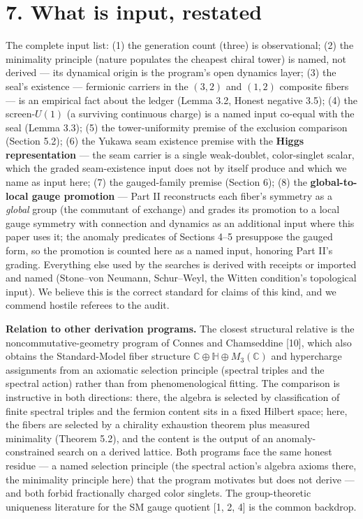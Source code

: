 \documentclass[11pt]{article}
\begin{document}
\section*{7. What is input, restated}
The complete input list: (1) the generation count (three) is observational; (2) the minimality principle (nature populates the cheapest chiral tower) is named, not derived — its dynamical origin is the program's open dynamics layer; (3) the seal's existence — fermionic carriers in the $(3,2)$ and $(1,2)$ composite fibers — is an empirical fact about the ledger (Lemma 3.2, Honest negative 3.5); (4) the screen-$U(1)$ (a surviving continuous charge) is a named input co-equal with the seal (Lemma 3.3); (5) the tower-uniformity premise of the exclusion comparison (Section 5.2); (6) the Yukawa seam existence premise with the \textbf{Higgs representation} — the seam carrier is a single weak-doublet, color-singlet scalar, which the graded seam-existence input does not by itself produce and which we name as input here; (7) the gauged-family premise (Section 6); (8) the \textbf{global-to-local gauge promotion} — Part II reconstructs each fiber's symmetry as a \emph{global} group (the commutant of exchange) and grades its promotion to a local gauge symmetry with connection and dynamics as an additional input where this paper uses it; the anomaly predicates of Sections 4–5 presuppose the gauged form, so the promotion is counted here as a named input, honoring Part II's grading.  Everything else used by the searches is derived with receipts or imported and named (Stone–von Neumann, Schur–Weyl, the Witten condition's topological input).  We believe this is the correct standard for claims of this kind, and we commend hostile referees to the audit.

\textbf{Relation to other derivation programs.}  The closest structural relative is the noncommutative-geometry program of Connes and Chamseddine [10], which also obtains the Standard-Model fiber structure $\mathbb C \oplus \mathbb H \oplus M_3(\mathbb C)$ and hypercharge assignments from an axiomatic selection principle (spectral triples and the spectral action) rather than from phenomenological fitting.  The comparison is instructive in both directions: there, the algebra is selected by classification of finite spectral triples and the fermion content sits in a fixed Hilbert space; here, the fibers are selected by a chirality exhaustion theorem plus measured minimality (Theorem 5.2), and the content is the output of an anomaly-constrained search on a derived lattice.  Both programs face the same honest residue — a named selection principle (the spectral action's algebra axioms there, the minimality principle here) that the program motivates but does not derive — and both forbid fractionally charged color singlets. The group-theoretic uniqueness literature for the SM gauge quotient [1, 2, 4] is the common backdrop.
\end{document}
